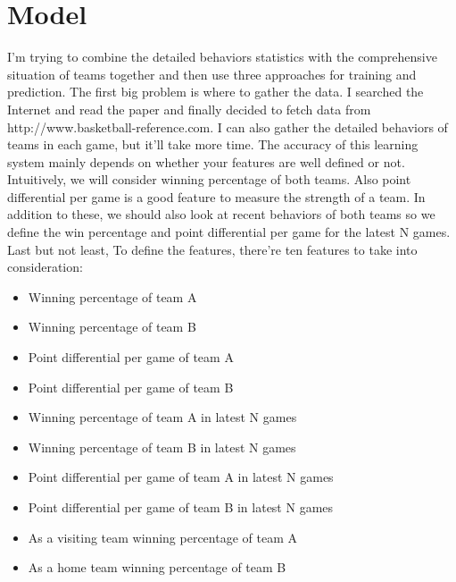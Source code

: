 \documentclass{article}
\begin{document}
\section{Model} 
 I'm trying to combine the detailed behaviors statistics with the comprehensive situation of teams together and then use three approaches for training and prediction. The first big problem is where to gather the data. I searched the Internet and read the paper and finally decided to fetch data from http://www.basketball-reference.com. I can also gather the detailed behaviors of teams in each game, but it'll take more time. The accuracy of this learning system mainly depends on whether your features are well defined or not. 
 Intuitively, we will consider winning percentage of both teams. Also point differential per game is a good feature to measure the strength of a team. In addition to these, we should also look at recent behaviors of both teams so we define the win percentage and point differential per game for the latest N games. Last but not least, To define the features, there're ten features to take into consideration:
\begin{itemize}
\item {Winning percentage of team A}
\item {Winning percentage of team B}
\item {Point differential per game of team A}
\item {Point differential per game of team B}
\item {Winning percentage of team A in latest N games}
\item {Winning percentage of team B in latest N games}
\item {Point differential per game of team A in latest N games}
\item {Point differential per game of team B in latest N games}
\item {As a visiting team winning percentage of team A}
\item {As a home team winning percentage of team B}
\end{itemize}
\end{document}
